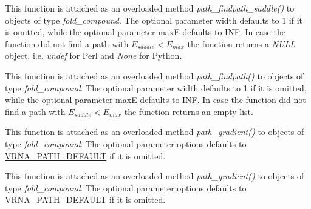 \begin{DoxyRefList}
\item[\label{wrappers__wrappers000070}%
\Hypertarget{wrappers__wrappers000070}%
Global \hyperlink{group__direct__paths_gada8d722e37401b1aea30128b07555771}{vrna\+\_\+path\+\_\+findpath\+\_\+saddle\+\_\+ub} (vrna\+\_\+fold\+\_\+compound\+\_\+t $\ast$vc, const char $\ast$s1, const char $\ast$s2, int width, int maxE)]This function is attached as an overloaded method {\itshape path\+\_\+findpath\+\_\+saddle()} to objects of type {\itshape fold\+\_\+compound}. The optional parameter {\ttfamily width} defaults to 1 if it is omitted, while the optional parameter {\ttfamily maxE} defaults to \hyperlink{constants_8h_a12c2040f25d8e3a7b9e1c2024c618cb6}{I\+NF}. In case the function did not find a path with $E_{saddle} < E_{max}$ the function returns a {\itshape N\+U\+LL} object, i.\+e. {\itshape undef} for Perl and {\itshape None} for Python.  
\item[\label{wrappers__wrappers000072}%
\Hypertarget{wrappers__wrappers000072}%
Global \hyperlink{group__direct__paths_ga8d47812616303f40057dfb033869863a}{vrna\+\_\+path\+\_\+findpath\+\_\+ub} (vrna\+\_\+fold\+\_\+compound\+\_\+t $\ast$vc, const char $\ast$s1, const char $\ast$s2, int width, int maxE)]This function is attached as an overloaded method {\itshape path\+\_\+findpath()} to objects of type {\itshape fold\+\_\+compound}. The optional parameter {\ttfamily width} defaults to 1 if it is omitted, while the optional parameter {\ttfamily maxE} defaults to \hyperlink{constants_8h_a12c2040f25d8e3a7b9e1c2024c618cb6}{I\+NF}. In case the function did not find a path with $E_{saddle} < E_{max}$ the function returns an empty list.  
\item[\label{wrappers__wrappers000100}%
\Hypertarget{wrappers__wrappers000100}%
Global \hyperlink{group__paths_gae92cce443a8a64f7b7fb89867b7d6125}{vrna\+\_\+path\+\_\+gradient} (vrna\+\_\+fold\+\_\+compound\+\_\+t $\ast$vc, short $\ast$pt, unsigned int options)]This function is attached as an overloaded method {\itshape path\+\_\+gradient()} to objects of type {\itshape fold\+\_\+compound}. The optional parameter {\ttfamily options} defaults to \hyperlink{group__paths_gaf1bb1f8fec8d24e3b821f621b19f77b4}{V\+R\+N\+A\+\_\+\+P\+A\+T\+H\+\_\+\+D\+E\+F\+A\+U\+LT} if it is omitted.  
\item[\label{wrappers__wrappers000101}%
\Hypertarget{wrappers__wrappers000101}%
Global \hyperlink{group__paths_ga9234756c337078fa599529d3db70d913}{vrna\+\_\+path\+\_\+random} (vrna\+\_\+fold\+\_\+compound\+\_\+t $\ast$vc, short $\ast$pt, unsigned int steps, unsigned int options)]This function is attached as an overloaded method {\itshape path\+\_\+gradient()} to objects of type {\itshape fold\+\_\+compound}. The optional parameter {\ttfamily options} defaults to \hyperlink{group__paths_gaf1bb1f8fec8d24e3b821f621b19f77b4}{V\+R\+N\+A\+\_\+\+P\+A\+T\+H\+\_\+\+D\+E\+F\+A\+U\+LT} if it is omitted.  

\end{DoxyRefList}
